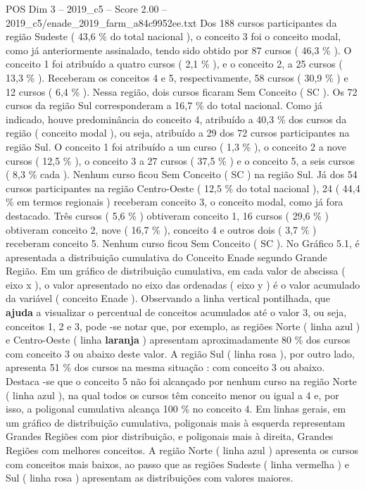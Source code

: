 \begin{textsample}{POS Dim 3 – 2019\_c5 – Score 2.00 – 2019\_c5/enade\_2019\_farm\_a84c9952ee.txt}
Dos 188 cursos participantes da região Sudeste ( 43,6 \% do total nacional ), o conceito 3 foi o conceito modal, como já anteriormente assinalado, tendo sido obtido por 87 cursos ( 46,3 \% ).
O conceito 1 foi atribuído a quatro cursos ( 2,1 \% ), e o conceito 2, a 25 cursos ( 13,3 \% ).
Receberam os conceitos 4 e 5, respectivamente, 58 cursos ( 30,9 \% ) e 12 cursos ( 6,4 \% ).
Nessa região, dois cursos ficaram Sem Conceito ( SC ).
Os 72 cursos da região Sul corresponderam a 16,7 \% do total nacional.
Como já indicado, houve predominância do conceito 4, atribuído a 40,3 \% dos cursos da região ( conceito modal ), ou seja, atribuído a 29 dos 72 cursos participantes na região Sul.
O conceito 1 foi atribuído a um curso ( 1,3 \% ), o conceito 2 a nove cursos ( 12,5 \% ), o conceito 3 a 27 cursos ( 37,5 \% ) e o conceito 5, a seis cursos ( 8,3 \% cada ).
Nenhum curso ficou Sem Conceito ( SC ) na região Sul.
Já dos 54 cursos participantes na região Centro-Oeste ( 12,5 \% do total nacional ), 24 ( 44,4 \% em termos regionais ) receberam conceito 3, o conceito modal, como já fora destacado.
Três cursos ( 5,6 \% ) obtiveram conceito 1, 16 cursos ( 29,6 \% ) obtiveram conceito 2, nove ( 16,7 \% ), conceito 4 e outros dois ( 3,7 \% ) receberam conceito 5.
Nenhum curso ficou Sem Conceito ( SC ).
No Gráfico 5.1, é apresentada a distribuição cumulativa do Conceito Enade segundo Grande Região.
Em um gráfico de distribuição cumulativa, em cada valor de abscissa ( eixo x ), o valor apresentado no eixo das ordenadas ( eixo y ) é o valor acumulado da variável ( conceito Enade ).
Observando a linha vertical pontilhada, que \textbf{ajuda} a visualizar o percentual de conceitos acumulados até o valor 3, ou seja, conceitos 1, 2 e 3, pode -se notar que, por exemplo, as regiões Norte ( linha azul ) e Centro-Oeste ( linha \textbf{laranja} ) apresentam aproximadamente 80 \% dos cursos com conceito 3 ou abaixo deste valor.
A região Sul ( linha rosa ), por outro lado, apresenta 51 \% dos cursos na mesma situação : com conceito 3 ou abaixo.
Destaca -se que o conceito 5 não foi alcançado por nenhum curso na região Norte ( linha azul ), na qual todos os cursos têm conceito menor ou igual a 4 e, por isso, a poligonal cumulativa alcança 100 \% no conceito 4.
Em linhas gerais, em um gráfico de distribuição cumulativa, poligonais mais à esquerda representam Grandes Regiões com pior distribuição, e poligonais mais à direita, Grandes Regiões com melhores conceitos.
A região Norte ( linha azul ) apresenta os cursos com conceitos mais baixos, ao passo que as regiões Sudeste ( linha vermelha ) e Sul ( linha rosa ) apresentam as distribuições com valores maiores.

\end{textsample}
